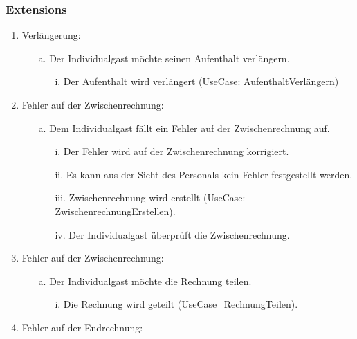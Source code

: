 \documentclass[./detailed_overview_usecases.tex]{subfiles}
\begin{document}
    \subsubsection*{Extensions}
    \begin{enumerate}
        \item Verlängerung:
                \begin{itemize}
                       \item[a.] Der Individualgast möchte seinen Aufenthalt verlängern.
                            \begin{itemize}
                                \item[i.] Der Aufenthalt wird verlängert (UseCase: AufenthaltVerlängern)
                            \end{itemize}
                \end{itemize}
        \setcounter{emuni}{2}
        \item Fehler auf der Zwischenrechnung:
            \begin{itemize}
                \item[a.] Dem Individualgast fällt ein Fehler auf der Zwischenrechnung auf.
                \begin{itemize}
                    \item[i.] Der Fehler wird auf der Zwischenrechnung korrigiert.
                    \item[ii.] Es kann aus der Sicht des Personals kein Fehler festgestellt werden.
                    \item[iii.] Zwischenrechnung wird erstellt (UseCase: ZwischenrechnungErstellen).
                    \item[iv.] Der Individualgast überprüft die Zwischenrechnung.
                \end{itemize}
            \end{itemize}
        \setcounter{emuni}{2}
        \item Fehler auf der Zwischenrechnung:
        \begin{itemize}
            \item[a.] Der Individualgast möchte die Rechnung teilen.
            \begin{itemize}
                \item[i.] Die Rechnung wird geteilt (UseCase_RechnungTeilen).
            \end{itemize}
        \end{itemize}
        \item Fehler auf der Endrechnung:

\end{enumerate}
\end{document}
